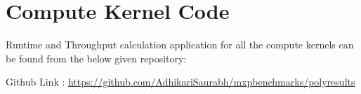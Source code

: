   
  \section{Compute Kernel Code}
  
  Runtime and Throughput calculation application for all the compute kernels can be found from the below given repository:
  
  
  
  
  Github Link : \url{https://github.com/AdhikariSaurabh/mxpbenchmarks/polyresults}
  
 
   
%  
% 
%    
%
%
    
    
    

